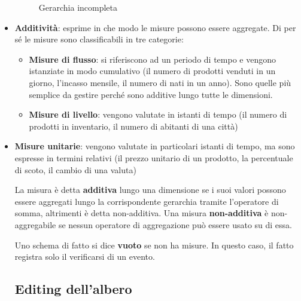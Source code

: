 \begin{itemize}
\begin{figure}[H]
		\caption{Gerarchia incompleta}
		\label{fig:incompleta}
	\end{figure}
	\item 
	\textbf{Additività}: esprime in che modo le misure possono essere aggregate. Di per sé le misure sono classificabili in tre categorie:
	\begin{itemize}
		\item 
		\textbf{Misure di flusso}: si riferiscono ad un periodo di tempo e vengono istanziate in modo cumulativo (il numero di prodotti venduti in un giorno, l’incasso mensile, il numero di nati in un anno). Sono quelle più semplice da gestire perché sono additive lungo tutte le dimensioni.
		\item 
		\textbf{Misure di livello}: vengono valutate in istanti di tempo (il numero di prodotti in inventario, il numero di abitanti di una città)
	\end{itemize}
	\item 
	\textbf{Misure unitarie}: vengono valutate in particolari istanti di tempo, ma sono espresse in termini relativi (il prezzo unitario di un prodotto, la percentuale di scoto, il cambio di una valuta) 
	
	La misura è detta \textbf{additiva} lungo una dimensione se i suoi valori possono essere aggregati lungo la corrispondente gerarchia tramite l’operatore di somma, altrimenti è detta non-additiva. Una misura \textbf{non-additiva} è non-aggregabile se nessun operatore di aggregazione può essere usato su di essa.  
	
	Uno schema di fatto si dice \textbf{vuoto} se non ha misure. In questo caso, il fatto registra solo il verificarsi di un evento.
	
	\subsection{Editing dell'albero}
	 
	
\end{itemize}
